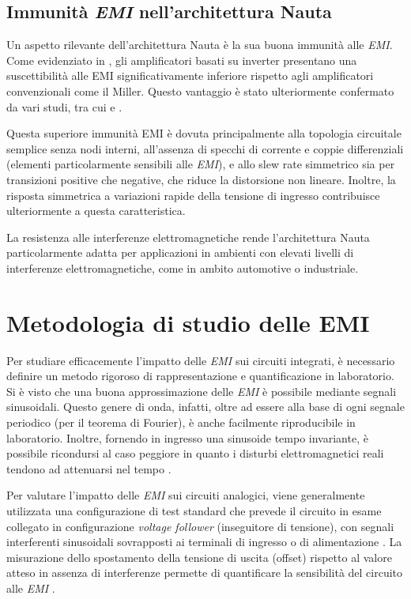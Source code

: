 \subsection{Immunità \textit{EMI} nell'architettura Nauta}

Un aspetto rilevante dell'architettura Nauta è la sua buona immunità alle \textit{EMI}. Come evidenziato in \cite{EMI_Immunity_of_the_Nauta_Inverter-Based_Amplifier}, gli amplificatori basati su inverter presentano una suscettibilità alle EMI significativamente inferiore rispetto agli amplificatori convenzionali come il Miller. Questo vantaggio è stato ulteriormente confermato da vari studi, tra cui \cite{Redoute-Richelli_EMC_Magazine} e \cite{finalprint}.

Questa superiore immunità EMI è dovuta principalmente alla topologia circuitale semplice senza nodi interni, all'assenza di specchi di corrente e coppie differenziali (elementi particolarmente sensibili alle \textit{EMI}), e allo slew rate simmetrico sia per transizioni positive che negative, che riduce la distorsione non lineare. Inoltre, la risposta simmetrica a variazioni rapide della tensione di ingresso contribuisce ulteriormente a questa caratteristica.

La resistenza alle interferenze elettromagnetiche rende l'architettura Nauta particolarmente adatta per applicazioni in ambienti con elevati livelli di interferenze elettromagnetiche, come in ambito automotive o industriale.

\section{Metodologia di studio delle EMI}
Per studiare efficacemente l'impatto delle \textit{EMI} sui circuiti integrati, è necessario definire un metodo rigoroso di rappresentazione e quantificazione in laboratorio. Si è visto che una buona approssimazione delle \textit{EMI} è possibile mediante segnali sinusoidali. Questo genere di onda, infatti, oltre ad essere alla base di ogni segnale periodico (per il teorema di Fourier), è anche facilmente riproducibile in laboratorio. Inoltre, fornendo in ingresso una sinusoide tempo invariante, è possibile ricondursi al caso peggiore in quanto i disturbi elettromagnetici reali tendono ad attenuarsi nel tempo \cite{capitolo2}.

Per valutare l'impatto delle \textit{EMI} sui circuiti analogici, viene generalmente utilizzata una configurazione di test standard che prevede il circuito in esame collegato in configurazione \textit{voltage follower} (inseguitore di tensione), con segnali interferenti sinusoidali sovrapposti ai terminali di ingresso o di alimentazione \cite{finalprint, Redoute-Richelli_EMC_Magazine}. La misurazione dello spostamento della tensione di uscita (offset) rispetto al valore atteso in assenza di interferenze permette di quantificare la sensibilità del circuito alle \textit{EMI} \cite{Measurements_of_EMI_susceptibility_of_precision_voltage_references}.

